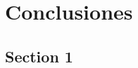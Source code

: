 \chapter{Conclusiones}
\label{chap:conclusiones}

 \blindtext

\section{Section 1}
\blindtext

\blindtext
